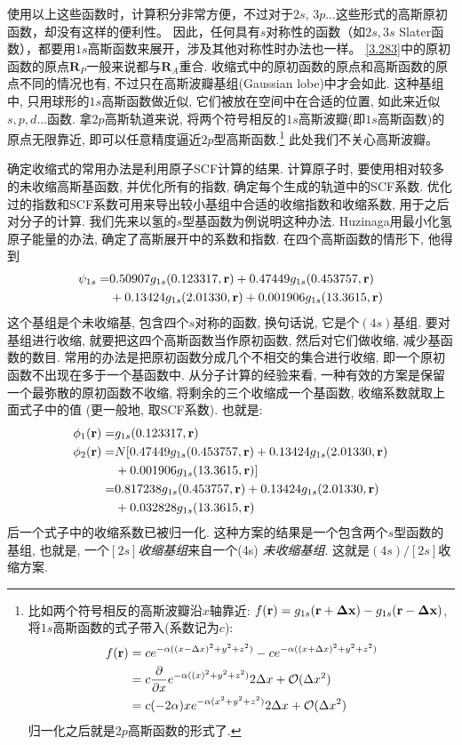使用以上这些函数时，计算积分非常方便，不过对于$2s$, $3p$...这些形式的高斯原初函数，却没有这样的便利性。
因此，任何具有$s$对称性的函数（如$2s,3s$ Slater函数），都要用$1s$高斯函数来展开，涉及其他对称性时办法也一样。
\eqref{3.283}中的原初函数的原点$\mathbf{R}_P$一般来说都与$\mathbf{R}_A$重合. 
收缩式中的原初函数的原点和高斯函数的原点不同的情况也有, 不过只在高斯波瓣基组(Gaussian lobe)中才会如此. 
这种基组中, 只用球形的$1s$高斯函数做近似, 它们被放在空间中在合适的位置, 如此来近似$s,p,d$...函数. 
拿$2p$高斯轨道来说, 将两个符号相反的$1s$高斯波瓣(即$1s$高斯函数)的原点无限靠近, 即可以任意精度逼近$2p$型高斯函数.\footnote{
	比如两个符号相反的高斯波瓣沿$x$轴靠近: $f(\mathbf{r})=g_{1s}(\mathbf{r}+\mathbf{\Delta x})-g_{1s}(\mathbf{r}-\mathbf{\Delta x})$, 
	将$1s$高斯函数的式子带入(系数记为$c$):
	\begin{align*}
		f(\mathbf{r}) & = ce^{-\alpha((x-\Delta x)^2+y^2+z^2)}-
		ce^{-\alpha((x+\Delta x)^2+y^2+z^2)}\\
		& = c\frac{\partial}{\partial x}e^{-\alpha((x)^2+y^2+z^2)}2\Delta x +\mathcal{O}(\Delta x^2)\\
		& = c(-2\alpha) xe^{-\alpha(x^2+y^2+z^2)}2\Delta x +\mathcal{O}(\Delta x^2)
	\end{align*}
	归一化之后就是$2p$高斯函数的形式了.
}
此处我们不关心高斯波瓣。


确定收缩式的常用办法是利用原子SCF计算的结果. 
计算原子时, 
要使用相对较多的未收缩高斯基函数, 
并优化所有的指数, 
确定每个生成的轨道中的SCF系数. 
优化过的指数和SCF系数可用来导出较小基组中合适的收缩指数和收缩系数, 
用于之后对分子的计算. 
我们先来以氢的$s$型基函数为例说明这种办法. 
Huzinaga用最小化氢原子能量的办法, 
确定了高斯展开中的系数和指数. 
在四个高斯函数的情形下, 
他得到
\begin{align}
	\psi_{1s} = &   0.50907g_{1s}(0.123317,\mathbf{r}) + 0.47449 g_{1s}(0.453757,\mathbf{r}) \notag\\
	& + 0.13424 g_{1s}(2.01330,\mathbf{r}) + 0.001906 g_{1s}(13.3615,\mathbf{r})
\end{align}
这个基组是个未收缩基, 
包含四个$s$对称的函数, 
换句话说, 
它是个$(4s)$基组. 
要对基组进行收缩, 
就要把这四个高斯函数当作原初函数, 
然后对它们做收缩, 
减少基函数的数目. 
常用的办法是把原初函数分成几个不相交的集合进行收缩, 
即一个原初函数不出现在多于一个基函数中. 
从分子计算的经验来看, 
一种有效的方案是保留一个最弥散的原初函数不收缩, 
将剩余的三个收缩成一个基函数, 
收缩系数就取上面式子中的值 (更一般地, 
取SCF系数). 
也就是:
\begin{align}
	\phi_1(\mathbf{r}) = & g_{1s}(0.123317,\mathbf{r})                                               \\
	\phi_2(\mathbf{r}) = & N[0.47449g_{1s}(0.453757,\mathbf{r})+ 0.13424 g_{1s}(2.01330,\mathbf{r}) \notag \\
	& + 0.001906 g_{1s}(13.3615,\mathbf{r})]                                    \\
	=              & 0.817238g_{1s}(0.453757,\mathbf{r})+ 0.13424 g_{1s}(2.01330,\mathbf{r})         \\
	& +0.032828 g_{1s}(13.3615,\mathbf{r})
\end{align}
后一个式子中的收缩系数已被归一化. 
这种方案的结果是一个包含两个$s$型函数的基组, 
也就是, 
一个\emph{$[2s]$收缩基组}来自一个(4s) \emph{未收缩基组}. 
这就是$(4s)/[2s]$收缩方案.


